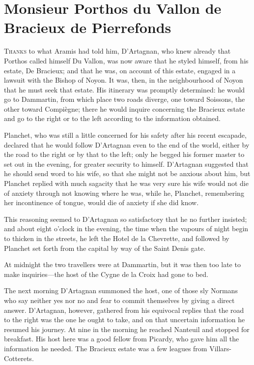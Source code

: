 \chapter{Monsieur Porthos du Vallon de Bracieux de Pierrefonds}

 \lettrine{T}{hanks} to what Aramis had told him, D'Artagnan, who knew already that Porthos called himself Du Vallon, was now aware that he styled himself, from his estate, De Bracieux; and that he was, on account of this estate, engaged in a lawsuit with the Bishop of Noyon. It was, then, in the neighbourhood of Noyon that he must seek that estate. His itinerary was promptly determined: he would go to Dammartin, from which place two roads diverge, one toward Soissons, the other toward Compiègne; there he would inquire concerning the Bracieux estate and go to the right or to the left according to the information obtained.

Planchet, who was still a little concerned for his safety after his recent escapade, declared that he would follow D'Artagnan even to the end of the world, either by the road to the right or by that to the left; only he begged his former master to set out in the evening, for greater security to himself. D'Artagnan suggested that he should send word to his wife, so that she might not be anxious about him, but Planchet replied with much sagacity that he was very sure his wife would not die of anxiety through not knowing where he was, while he, Planchet, remembering her incontinence of tongue, would die of anxiety if she did know.

This reasoning seemed to D'Artagnan so satisfactory that he no further insisted; and about eight o'clock in the evening, the time when the vapours of night begin to thicken in the streets, he left the Hotel de la Chevrette, and followed by Planchet set forth from the capital by way of the Saint Denis gate.

At midnight the two travellers were at Dammartin, but it was then too late to make inquiries—the host of the Cygne de la Croix had gone to bed.

The next morning D'Artagnan summoned the host, one of those sly Normans who say neither yes nor no and fear to commit themselves by giving a direct answer. D'Artagnan, however, gathered from his equivocal replies that the road to the right was the one he ought to take, and on that uncertain information he resumed his journey. At nine in the morning he reached Nanteuil and stopped for breakfast. His host here was a good fellow from Picardy, who gave him all the information he needed. The Bracieux estate was a few leagues from Villars-Cotterets.


